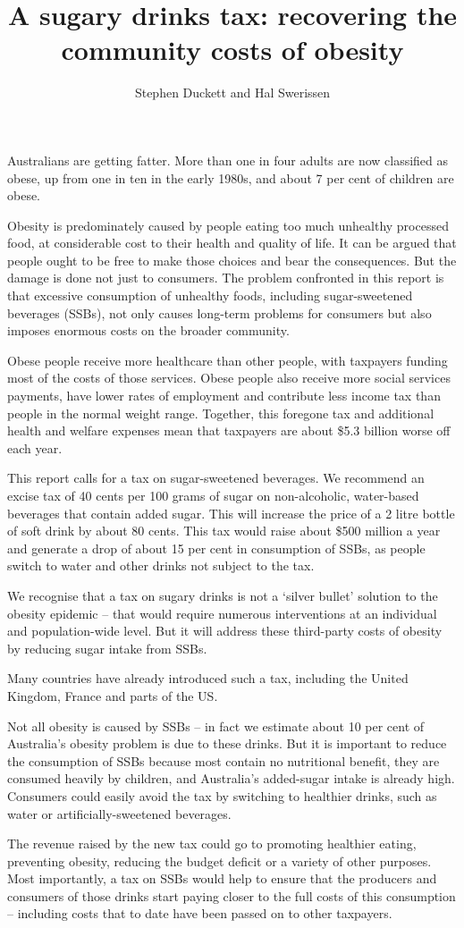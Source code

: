 \documentclass[embargoed]{grattan}
\title{A sugary drinks tax: recovering the community costs of obesity}
\author{Stephen Duckett and Hal Swerissen}
\begin{document}
\begin{overview}

Australians are getting fatter.
More than one in four adults are now classified as obese, up from one in ten in the early 1980s, and about 7 per cent of children are obese.

Obesity is predominately caused by people eating too much unhealthy processed food, at considerable cost to their health and quality of life.
It can be argued that people ought to be free to make those choices and bear the consequences.
But the damage is done not just to consumers.
The problem confronted in this report is that excessive consumption of unhealthy foods, including sugar-sweetened beverages (SSBs), not only causes long-term problems for consumers but also imposes enormous costs on the broader community.

Obese people receive more healthcare than other people, with taxpayers funding most of the costs of those services.
Obese people also receive more social services payments, have lower rates of employment and contribute less income tax than people in the normal weight range.
Together, this foregone tax and additional health and welfare expenses mean that taxpayers are about \$5.3 billion worse off each year. 

This report calls for a tax on sugar-sweetened beverages.
We recommend an excise tax of 40 cents per 100 grams of sugar on non-alcoholic, water-based beverages that contain added sugar.
This will increase the price of a 2 litre bottle of soft drink by about 80 cents.
This tax would raise about \$500 million a year and generate a drop of about 15 per cent in consumption of SSBs, as people switch to water and other drinks not subject to the tax. 

We recognise that a tax on sugary drinks is not a ‘silver bullet’ solution to the obesity epidemic – that would require numerous interventions at an individual and population-wide level.
But it will address these third-party costs of obesity by reducing sugar intake from SSBs.

Many countries have already introduced such a tax, including the United Kingdom, France and parts of the US.

Not all obesity is caused by SSBs – in fact we estimate about 10 per cent of Australia’s obesity problem is due to these drinks.
But it is important to reduce the consumption of SSBs because most contain no nutritional benefit, they are consumed heavily by children, and Australia’s added-sugar intake is already high.
Consumers could easily avoid the tax by switching to healthier drinks, such as water or artificially-sweetened beverages.

The revenue raised by the new tax could go to promoting healthier eating, preventing obesity, reducing the budget deficit or a variety of other purposes.
Most importantly, a tax on SSBs would help to ensure that the producers and consumers of those drinks start paying closer to the full costs of this consumption – including costs that to date have been passed on to other taxpayers.



\end{overview}
\end{document}
